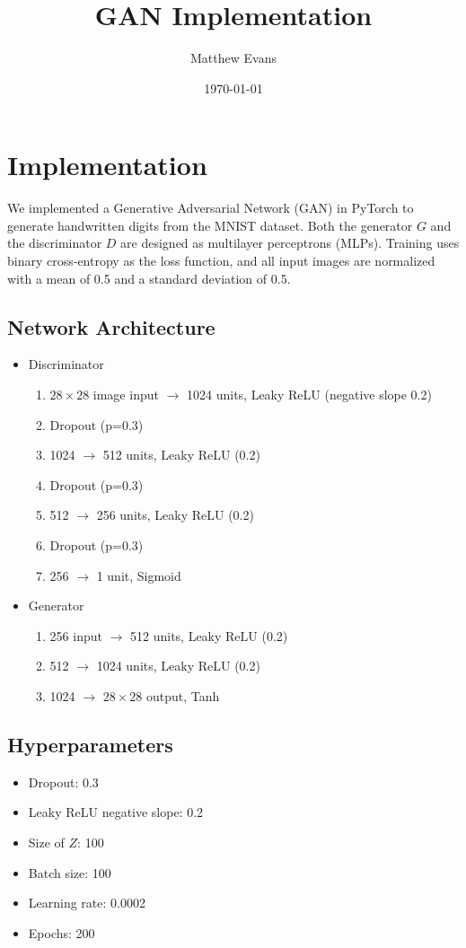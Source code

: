 \documentclass[11pt,a4paper]{article}
\title{GAN Implementation}
\author{Matthew Evans}
\date{\today}
\begin{document}
\maketitle



\section{Implementation}
We implemented a Generative Adversarial Network (GAN) in PyTorch to generate handwritten digits from the MNIST dataset. Both the generator \(G\) and the discriminator \(D\) are designed as multilayer perceptrons (MLPs). Training uses binary cross‐entropy as the loss function, and all input images are normalized with a mean of 0.5 and a standard deviation of 0.5.

\subsection{Network Architecture}
\begin{itemize}
    \item Discriminator
          \begin{enumerate}
              \item \(28\times28\) image input \(\to\) 1024 units, Leaky ReLU (negative slope 0.2)
              \item Dropout (p=0.3)
              \item 1024 \(\to\) 512 units, Leaky ReLU (0.2)
              \item Dropout (p=0.3)
              \item 512 \(\to\) 256 units, Leaky ReLU (0.2)
              \item Dropout (p=0.3)
              \item 256 \(\to\) 1 unit, Sigmoid
          \end{enumerate}
    \item Generator
          \begin{enumerate}
              \item 256 input \(\to\) 512 units, Leaky ReLU (0.2)
              \item 512 \(\to\) 1024 units, Leaky ReLU (0.2)
              \item 1024 \(\to\) \(28\times28\) output, Tanh
          \end{enumerate}
\end{itemize}

\subsection{Hyperparameters}
\begin{itemize}
    \item Dropout: 0.3
    \item Leaky ReLU negative slope: 0.2
    \item Size of \(Z\): 100
    \item Batch size: 100
    \item Learning rate: 0.0002
    \item Epochs: 200
\end{itemize}
\end{document}

